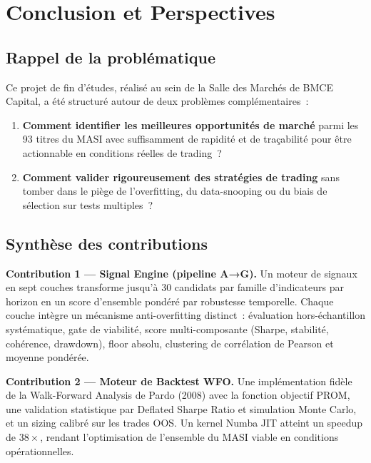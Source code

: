 \chapter*{Conclusion et Perspectives}

\section*{Rappel de la problématique}

Ce projet de fin d'études, réalisé au sein de la Salle des Marchés de BMCE Capital,
a été structuré autour de deux problèmes complémentaires~:

\begin{enumerate}
    \item \textbf{Comment identifier les meilleures opportunités de marché} parmi les
    93 titres du MASI avec suffisamment de rapidité et de traçabilité pour être
    actionnable en conditions réelles de trading~?
    \item \textbf{Comment valider rigoureusement des stratégies de trading} sans
    tomber dans le piège de l'overfitting, du data-snooping ou du biais de sélection
    sur tests multiples~?
\end{enumerate}

\section*{Synthèse des contributions}

\textbf{Contribution 1 — Signal Engine (pipeline A→G).}
Un moteur de signaux en sept couches transforme jusqu'à 30 candidats par famille d'indicateurs par horizon
en un score d'ensemble pondéré par robustesse temporelle. Chaque couche intègre un mécanisme
anti-overfitting distinct~: évaluation hors-échantillon systématique, gate de viabilité,
score multi-composante (Sharpe, stabilité, cohérence, drawdown), floor absolu,
clustering de corrélation de Pearson et moyenne pondérée.

\textbf{Contribution 2 — Moteur de Backtest WFO.}
Une implémentation fidèle de la Walk-Forward Analysis de Pardo (2008) avec la fonction
objectif PROM, une validation statistique par Deflated Sharpe Ratio et simulation
Monte Carlo, et un sizing calibré sur les trades OOS. Un kernel Numba JIT atteint un
speedup de $38\times$, rendant l'optimisation de l'ensemble du MASI viable en
conditions opérationnelles.

